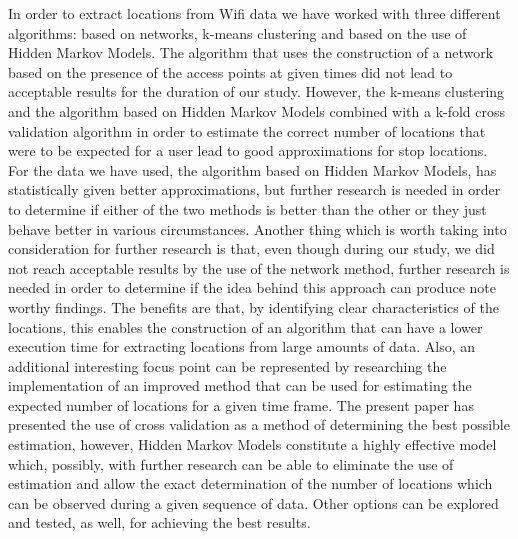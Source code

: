 In order to extract locations from Wifi data we have worked with three different
algorithms: based on networks, k-means clustering and based on the use of Hidden
Markov Models. The algorithm that uses the construction of a network based on
the presence of the access points at given times did not lead to acceptable
results for the duration of our study. However, the k-means clustering and the
algorithm based on Hidden Markov Models combined with a k-fold cross validation
algorithm in order to estimate the correct number of locations that were to be
expected for a user lead to good approximations for stop locations. For the data
we have used, the algorithm based on Hidden Markov Models, has statistically
given better approximations, but further research is needed in order to
determine if either of the two methods is better than the other or they just
behave better in various circumstances. Another thing which is worth taking into
consideration for further research is that, even though during our study, we did
not reach acceptable results by the use of the network method, further research
is needed in order to determine if the idea behind this approach can produce
note worthy findings. The benefits are that, by identifying clear
characteristics of the locations, this enables the construction of an algorithm
that can have a lower execution time for extracting locations from large amounts
of data. Also, an additional interesting focus point can be represented by
researching the implementation of an improved method that can be used for
estimating the expected number of locations for a given time frame. The present
paper has presented the use of cross validation as a method of determining the
best possible estimation, however, Hidden Markov Models constitute a highly
effective model which, possibly, with further research can be able to eliminate
the use of estimation and allow the exact determination of the number of
locations which can be observed during a given sequence of data. Other options
can be explored and tested, as well, for achieving the best results.

